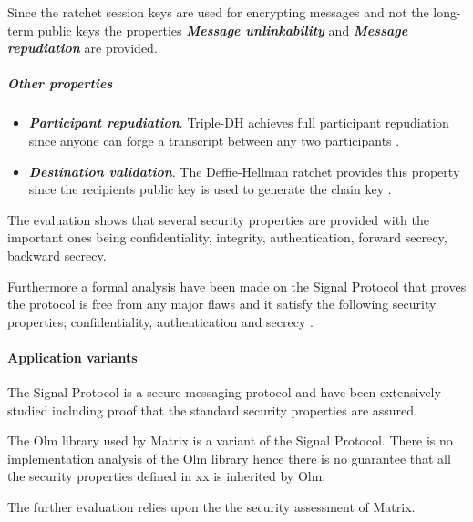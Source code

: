 Since the ratchet session keys are used for encrypting messages and not the long-term public keys the properties \textbf{\emph{Message unlinkability}} and \textbf{\emph{Message repudiation}} are provided. 


\subparagraph{Other properties}

\begin{itemize}
	\item \textbf{\emph{Participant repudiation}}. Triple-DH achieves full participant repudiation since anyone can forge a transcript between any two participants \cite{sok}.
	\item \textbf{\emph{Destination validation}}. The Deffie-Hellman ratchet provides this property since the recipients public key is used to generate the chain key \cite{sok}. %
\end{itemize}


The evaluation shows that several security properties are provided with the important ones being confidentiality, integrity, authentication, forward secrecy, backward secrecy. 

Furthermore a formal analysis have been made on the Signal Protocol that proves the protocol is free from any major flaws and it satisfy the following security properties; confidentiality, authentication and secrecy \cite{Signal}. 

\paragraph{Application variants}

The Signal Protocol is a secure messaging protocol and have been extensively studied including proof that the standard security properties are assured. 

The Olm library used by Matrix is a variant of the Signal Protocol. There is no implementation analysis of the Olm library hence there is no guarantee that all the security properties defined in xx is inherited by Olm.

The further evaluation relies upon the the security assessment of Matrix. 



